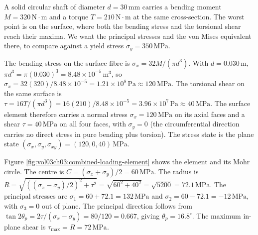 A solid circular shaft of diameter $d = 30\,\si{\milli\meter}$ carries
a bending moment $M = 320\,\text{N}\cdot\text{m}$ and a torque $T =
210\,\text{N}\cdot\text{m}$ at the same cross-section. The worst point
is on the surface, where both the bending stress and the torsional
shear reach their maxima. We want the principal stresses and the von
Mises equivalent there, to compare against a yield stress $\sigma_y =
350\,\text{MPa}$.

The bending stress on the surface fibre is $\sigma_x = 32M/(\pi d^3)$.
With $d = 0.030\,\si{\meter}$, $\pi d^3 = \pi(0.030)^3 = 8.48\times
10^{-5}\,\si{\meter}^3$, so $\sigma_x = 32(320)/8.48\times 10^{-5} =
1.21\times 10^8\,\text{Pa} \approx 120\,\text{MPa}$. The torsional
shear on the same surface is $\tau = 16T/(\pi d^3) = 16(210)/8.48\times
10^{-5} = 3.96\times 10^7\,\text{Pa} \approx 40\,\text{MPa}$. The
surface element therefore carries a normal stress $\sigma_x = 120\,
\text{MPa}$ on its axial faces and a shear $\tau = 40\,\text{MPa}$ on
all four faces, with $\sigma_y = 0$ (the circumferential direction
carries no direct stress in pure bending plus torsion). The stress
state is the plane state $(\sigma_x, \sigma_y, \sigma_{xy}) = (120, 0,
40)\,\text{MPa}$.



Figure \ref{fig:vol03ch03:combined-loading-element} shows the element
and its Mohr circle. The centre is $C = (\sigma_x + \sigma_y)/2 = 60\,
\text{MPa}$. The radius is $R = \sqrt{((\sigma_x - \sigma_y)/2)^2 +
\tau^2} = \sqrt{60^2 + 40^2} = \sqrt{5200} = 72.1\,\text{MPa}$. The
principal stresses are $\sigma_1 = 60 + 72.1 = 132\,\text{MPa}$ and
$\sigma_2 = 60 - 72.1 = -12\,\text{MPa}$, with $\sigma_3 = 0$ out of
plane. The principal direction follows from $\tan 2\theta_p =
2\tau/(\sigma_x - \sigma_y) = 80/120 = 0.667$, giving $\theta_p =
16.8^{\circ}$. The maximum in-plane shear is $\tau_{\max} = R = 72\,
\text{MPa}$.

